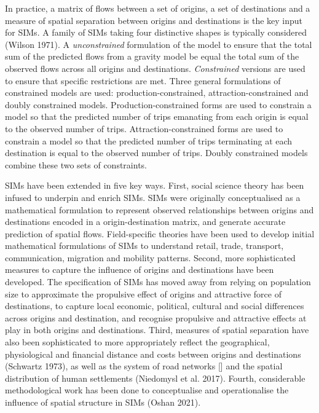 \documentclass[11pt,letterpaper]{article}
\begin{document}
In practice, a matrix of flows between a set of origins, a set of destinations and a measure of spatial separation between origins and destinations is the key input for SIMs.
A family of SIMs taking four distinctive shapes is typically considered (Wilson 1971).
A \emph{unconstrained} formulation of the model to ensure that the total sum of the predicted flows from a gravity model be equal the total sum of the observed flows across all origins and destinations.
\emph{Constrained} versions are used to ensure that specific restrictions are met.
Three general formulations of constrained models are used: production-constrained, attraction-constrained and doubly constrained models.
Production-constrained forms are used to constrain a model so that the predicted number of trips emanating from each origin is equal to the observed number of trips.
Attraction-constrained forms are used to constrain a model so that the predicted number of trips terminating at each destination is equal to the observed number of trips.
Doubly constrained models combine these two sets of constraints.

SIMs have been extended in five key ways.
First, social science theory has been infused to underpin and enrich SIMs.
SIMs were originally conceptualised as a mathematical formulation to represent observed relationships between origins and destinations encoded in a origin-destination matrix, and generate accurate prediction of spatial flows.
Field-specific theories have been used to develop initial mathematical formulations of SIMs to understand retail, trade, transport, communication, migration and mobility patterns.
Second, more sophisticated measures to capture the influence of origins and destinations have been developed.
The specification of SIMs has moved away from relying on population size to approximate the propulsive effect of origins and attractive force of destinations, to capture local economic, political, cultural and social differences across origins and destination, and recognise propulsive and attractive effects at play in both origins and destinations.
Third, measures of spatial separation have also been sophisticated to more appropriately reflect the geographical, physiological and financial distance and costs between origins and destinations (Schwartz 1973), as well as the system of road networks {[}{]} and the spatial distribution of human settlements (Niedomysl et al. 2017).
Fourth, considerable methodological work has been done to conceptualise and operationalise the influence of spatial structure in SIMs (Oshan 2021).
\end{document}
